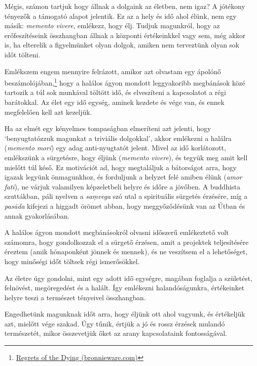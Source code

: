 \clearpage
\normalpagelayout

Mégis, számon tartjuk hogy állnak a dolgaink az életben, nem igaz? A
jótékony tényezők a támogató alapot jelentik. Ez az a hely és idő ahol
élünk, nem egy másik: \emph{memento vivere}, emlékezz, hogy élj. Tudjuk
magunkról, hogy az erőfeszítéseink összhangban állnak a központi
értékeinkkel vagy sem, még akkor is, ha elterelik a figyelmünket olyan
dolgok, amiken nem terveztünk olyan sok időt tölteni.

Emlékszem engem mennyire felrázott, amikor azt olvastam egy ápolónő
beszámolójában,\footnote{\href{https://bronnieware.com/blog/regrets-of-the-dying/}{Regrets
  of the Dying (bronnieware.com)}} hogy a halálos ágyon mondott
leggyakoribb megbánások közé tartozik a túl sok munkával töltött idő, és
elveszíteni a kapcsolatot a régi barátokkal. Az élet egy idő egység,
aminek kezdete és vége van, és ennek megfelelően kell azt kezeljük.


Ha az elmét egy kényelmes tompaságban elmeríteni azt jelenti, hogy
`benyugtatózzuk magunkat a triviális dolgokkal', akkor emlékezni a
halálra (\emph{memento mori}) egy adag anti-nyugtatót jelent. Mivel az
idő korlátozott, emlékszünk a sürgetésre, hogy éljünk (\emph{memento
vivere}), és tegyük meg amit kell mielőtt túl késő. Ez motivációt ad,
hogy megtaláljuk a bátorságot arra, hogy igazak legyünk önmagunkhoz, és
forduljunk a helyzet felé amiben élünk (\emph{amor fati}), ne várjuk
valamilyen képzeletbeli helyre és időre a jövőben. A buddhista
szuttákban, páli nyelven a \emph{saṃvega} szó utal a spirituális
sürgetés érzésére, míg a \emph{pasāda} kifejezi a higgadt örömet abban,
hogy meggyőződésünk van az Útban és annak gyakorlásában.

A halálos ágyon mondott megbánásokról olvasni időszerű emlékeztető volt
számomra, hogy gondolkozzak el a sürgető érzésen, amit a projektek
teljesítésére éreztem (amik hónaponként jönnek és mennek), és ne
veszítsem el a lehetőséget, hogy minőségi időt töltsek régi
ismerősökkel.

Az életre úgy gondolni, mint egy adott idő egységre, magában foglalja a
születést, felnövést, megöregedést és a halált. Így emlékezni
halandóságunkra, értékeinket helyre teszi a természet tényeivel
összhangban.

Engedhetünk magunknak időt arra, hogy éljünk ott ahol vagyunk, és
értékeljük azt, mielőtt vége szakad. Úgy tűnik, értjük a jó és rossz
érzések mulandó természetét, mikor összevetjük őket az arany
kapcsolataink fontosságával.

